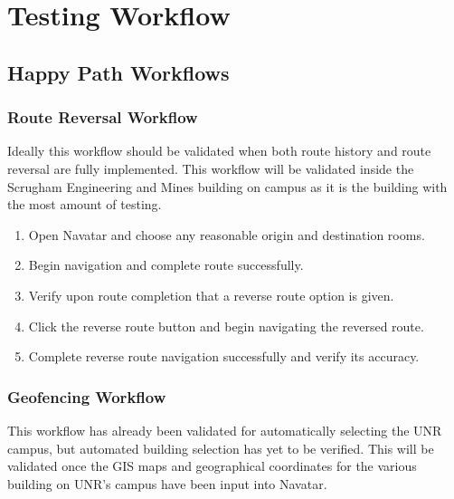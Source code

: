 \documentclass{scrreprt}
\begin{document}
\pagebreak

\chapter{Testing Workflow}

\section{Happy Path Workflows}

\subsection{Route Reversal Workflow}

Ideally this workflow should be validated when both route history and route reversal are fully implemented. This workflow will be validated inside the Scrugham Engineering and Mines building on campus as it is the building with the most amount of testing.

\begin{enumerate}
	\item Open Navatar and choose any reasonable origin and destination rooms.
	
	\item Begin navigation and complete route successfully.
	
	\item Verify upon route completion that a reverse route option is given.
	
	\item Click the reverse route button and begin navigating the reversed route.
	
	\item Complete reverse route navigation successfully and verify its accuracy.

\end{enumerate}

\subsection{Geofencing Workflow}

This workflow has already been validated for automatically selecting the UNR campus, but automated building selection has yet to be verified. This will be validated once the GIS maps and geographical coordinates for the various building on UNR’s campus have been input into Navatar.
\end{document}

